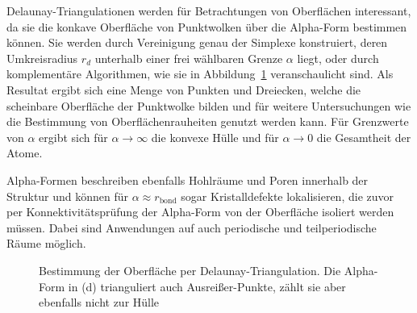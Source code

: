 Delaunay-Triangulationen werden für Betrachtungen von Oberflächen interessant, da sie die konkave Oberfläche von Punktwolken über die Alpha-Form bestimmen können.
Sie werden durch Vereinigung genau der Simplexe konstruiert, deren Umkreisradius $r_d$ unterhalb einer frei wählbaren Grenze $\alpha$ liegt, oder durch komplementäre Algorithmen, wie sie in Abbildung~\ref{fig:delaunay-alpha} veranschaulicht sind.
Als Resultat ergibt sich eine Menge von Punkten und Dreiecken, welche die scheinbare Oberfläche der Punktwolke bilden und für weitere Untersuchungen wie die Bestimmung von Oberflächenrauheiten genutzt werden kann.
Für Grenzwerte von $\alpha$ ergibt sich für $\alpha \rightarrow \infty$ die konvexe Hülle und für $\alpha \rightarrow 0$ die Gesamtheit der Atome.

Alpha-Formen beschreiben ebenfalls Hohlräume und Poren innerhalb der Struktur und können für $\alpha \approx r_\text{bond}$ sogar Kristalldefekte lokalisieren, die zuvor per Konnektivitätsprüfung der Alpha-Form von der Oberfläche isoliert werden müssen.
Dabei sind Anwendungen auf auch periodische und teilperiodische Räume möglich.

\begin{figure}[!h]
  \centering
  \vspace{2em}
  \caption[Delaunay-Triangulation: Konvexe Hülle und Alpha-Form]{
    Bestimmung der Oberfläche per Delaunay-Triangulation.
    Die Alpha-Form in (d) trianguliert auch Ausreißer-Punkte, zählt sie aber ebenfalls nicht zur Hülle
  }
  \label{fig:delaunay-alpha}
\end{figure}
